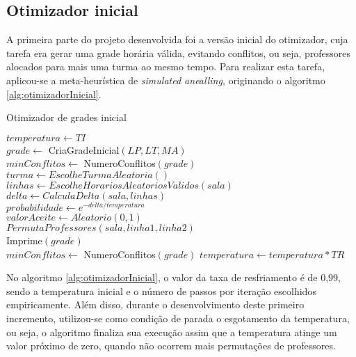 \subsection{Otimizador inicial}

A primeira parte do projeto desenvolvida foi a versão inicial do otimizador, cuja tarefa era gerar uma grade horária válida, evitando conflitos, ou seja, professores alocados para mais uma turma ao mesmo tempo. Para realizar esta tarefa, aplicou-se a meta-heurística de \textit{simulated anealling}, originando o algoritmo \ref{alg:otimizadorInicial}.

\begin{algorithm}
	\caption{Otimizador de grades inicial}
	\label{alg:otimizadorInicial}
	$temperatura \leftarrow TI$\\
	$grade \leftarrow$ CriaGradeInicial$(LP, LT, MA)$\\
	$minConflitos \leftarrow$ NumeroConflitos$(grade)$\\
	 {
		 {
			$turma \leftarrow EscolheTurmaAleatoria()$\\
			$linhas \leftarrow EscolheHorariosAleatoriosValidos(sala)$\\
			$delta \leftarrow CalculaDelta(sala, linhas)$\\
			$probabilidade \leftarrow e^{-delta/temperatura}$\\
			$valorAceite \leftarrow Aleatorio(0, 1)$\\
			 {
				$PermutaProfessores(sala, linha1, linha2)$\\
				 {
					Imprime$(grade)$\\
					$minConflitos \leftarrow$ NumeroConflitos$(grade)$
				}
			}
		}
		$temperatura \leftarrow temperatura * TR$
	}
\end{algorithm}

No algoritmo \ref{alg:otimizadorInicial}, o valor da taxa de resfriamento é de 0,99, sendo a temperatura inicial e o número de passos por iteração escolhidos empiricamente. Além disso, durante o desenvolvimento deste primeiro incremento, utilizou-se como condição de parada o esgotamento da temperatura, ou seja, o algoritmo finaliza sua execução assim que a temperatura atinge um valor próximo de zero, quando não ocorrem mais permutações de professores.

